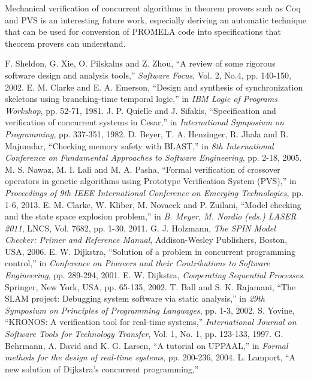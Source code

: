 \documentclass[conference]{IEEEtran}
\begin{document}
Mechanical verification of concurrent algorithms in theorem provers such as Coq \cite{32} and PVS \cite{18} is an interesting future work, 
especially deriving an automatic technique that can be used for conversion of PROMELA code into specifications that theorem provers 
can understand.
\begin{thebibliography}{50}
 F. Sheldon, G. Xie, O. Pilskalns and Z. Zhou, ``A review of some rigorous software design and analysis tools,'' 
\emph{Software Focus}, Vol. 2, No.4, pp. 140-150, 2002.
 E. M. Clarke and E. A. Emerson, ``Design and synthesis of synchronization skeletons using branching-time temporal logic,'' 
in \emph{IBM Logic of Programs Workshop}, pp. 52-71, 1981. 
 J. P. Quielle and J. Sifakis, ``Specification and verification of concurrent systems in Cesar,'' 
in \emph{International Symposium on Programming}, pp. 337-351, 1982.
 D. Beyer, T. A. Henzinger, R. Jhala and R. Majumdar, ``Checking memory safety with BLAST,'' 
in \emph{8th International Conference on Fundamental Approaches to Software Engineering}, pp. 2-18, 2005. 
 M. S. Nawaz, M. I. Lali and M. A. Pasha, ``Formal verification of crossover operators in genetic algorithms using Prototype Verification 
System (PVS),'' in \emph{Proceedings of 9th IEEE International Conference on Emerging Technologies}, pp. 1-6, 2013.
 E. M. Clarke, W. Kliber, M. Novacek and P. Zuilani, ``Model checking and the state space explosion problem,'' 
in \emph{B. Meyer, M. Nordio (eds.) LASER 2011}, LNCS, Vol. 7682, pp. 1-30, 2011.
 G. J. Holzmann, \emph{The SPIN Model Checker: Primer and Reference Manual}, Addison-Wesley Publishers, Boston, USA, 2006. 
 E. W. Dijkstra, ``Solution of a problem in concurrent programming control,'' 
in \emph{Conference on Pioneers and their Contributions to Software Engineering}, pp. 289-294, 2001.
 E. W. Dijkstra, \emph{Cooperating Sequential Processes}.  Springer, New York, USA, pp. 65-135, 2002. 
 T. Ball and S. K. Rajamani, ``The SLAM project: Debugging system software via static analysis,'' 
in \emph{29th Symposium on Principles of Programming Languages}, pp. 1-3, 2002.
 S. Yovine, ``KRONOS:  A verification tool for real-time systems,'' 
\emph{International Journal on Software Tools for Technology Transfer}, Vol. 1, No. 1, pp. 123-133, 1997.
 G. Behrmann, A. David and K. G. Larsen, ``A tutorial on UPPAAL,'' 
in \emph{Formal methods for the design of real-time systems}, pp. 200-236, 2004.
 L. Lamport, ``A new solution of Dijkstra's concurrent programming,'' 

\end{thebibliography}
\end{document}
